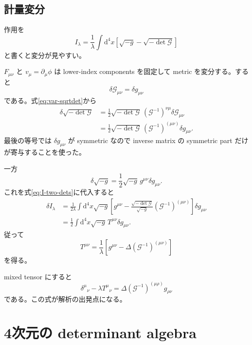 \documentclass[a4paper,11pt]{ltjsreport}
\newcommand{\dd}{\mathrm{d}}
\newcommand{\G}{\mathcal G}
\begin{document}
\section{計量変分}

作用を
\begin{equation}
 I_\lambda
 =\frac1\lambda\int\dd^4x
 \left[\sqrt{-g}-\sqrt{-\det\G}\right]
 \label{eq:I-two-dets}
\end{equation}
と書くと変分が見やすい。

$F_{\mu\nu}$ と $v_\mu=\partial_\mu\phi$ は lower-index components を固定して metric を変分する。すると
\begin{equation}
 \delta\G_{\mu\nu}=\delta g_{\mu\nu}
\end{equation}
である。式\eqref{eq:var-sqrtdet}から
\begin{align}
 \delta\sqrt{-\det\G}
 &=\frac12\sqrt{-\det\G}\,
 (\G^{-1})^{\nu\mu}\delta\G_{\mu\nu}\\
 &=\frac12\sqrt{-\det\G}\,
 (\G^{-1})^{(\mu\nu)}\delta g_{\mu\nu}.
 \label{eq:var-Gdet}
\end{align}
最後の等号では $\delta g_{\mu\nu}$ が symmetric なので inverse matrix の symmetric part だけが寄与することを使った。

一方
\begin{equation}
 \delta\sqrt{-g}
 =\frac12\sqrt{-g}\,g^{\mu\nu}\delta g_{\mu\nu}.
\end{equation}
これを式\eqref{eq:I-two-dets}に代入すると
\begin{align}
 \delta I_\lambda
 &=\frac{1}{2\lambda}\int\dd^4x\sqrt{-g}
 \left[g^{\mu\nu}
 -\frac{\sqrt{-\det\G}}{\sqrt{-g}}
 (\G^{-1})^{(\mu\nu)}\right]\delta g_{\mu\nu}\\
 &=\frac12\int\dd^4x\sqrt{-g}\,T^{\mu\nu}\delta g_{\mu\nu}.
\end{align}
従って
\begin{equation}
 T^{\mu\nu}
 =\frac1\lambda
 \left[g^{\mu\nu}-\Delta(\G^{-1})^{(\mu\nu)}\right]
 \label{eq:T-DBI}
\end{equation}
を得る。

mixed tensor にすると
\begin{equation}
 \delta^\mu{}_{\nu}-\lambda T^\mu{}_{\nu}
 =\Delta(\G^{-1})^{(\mu\rho)}g_{\rho\nu}
 \label{eq:A-Ginverse}
\end{equation}
である。この式が解析の出発点になる。

\chapter{4次元の determinant algebra}
\end{document}
